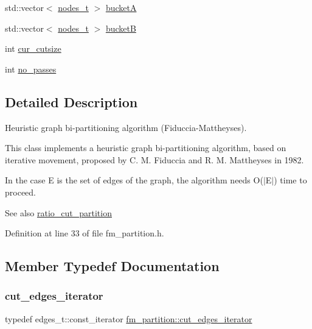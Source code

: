 \begin{DoxyCompactItemize}
std\+::vector$<$ \mbox{\hyperlink{edge_8h_a22ac17689106ba21a84e7bc54d1199d6}{nodes\+\_\+t}} $>$ \mbox{\hyperlink{classfm__partition_a399955e0c84bad93cb82b5ffe8cf4a04}{bucketA}}
\item 
std\+::vector$<$ \mbox{\hyperlink{edge_8h_a22ac17689106ba21a84e7bc54d1199d6}{nodes\+\_\+t}} $>$ \mbox{\hyperlink{classfm__partition_ae6a5b5f3f2d95ea229882e861ccfc9e4}{bucketB}}
\item 
int \mbox{\hyperlink{classfm__partition_abc8f24c354d2a15f8ec8ef9a46252c93}{cur\+\_\+cutsize}}
\item 
int \mbox{\hyperlink{classfm__partition_af35277f499ad76a979ee33b0cd388dc5}{no\+\_\+passes}}
\end{DoxyCompactItemize}


\subsection{Detailed Description}
Heuristic graph bi-\/partitioning algorithm (Fiduccia-\/\+Mattheyses). 

This class implements a heuristic graph bi-\/partitioning algorithm, based on iterative movement, proposed by C. M. Fiduccia and R. M. Mattheyses in 1982.

In the case E is the set of edges of the graph, the algorithm needs {\ttfamily O($\vert$\+E$\vert$)} time to proceed.

\begin{DoxySeeAlso}{See also}
\mbox{\hyperlink{classratio__cut__partition}{ratio\+\_\+cut\+\_\+partition}} 
\end{DoxySeeAlso}


Definition at line 33 of file fm\+\_\+partition.\+h.



\subsection{Member Typedef Documentation}
\mbox{\label{classfm__partition_a15e854cf1efcae91d05a48f2a9fd0761}} 
\subsubsection{\texorpdfstring{cut\+\_\+edges\+\_\+iterator}{cut\_edges\_iterator}}
{\footnotesize\ttfamily typedef edges\+\_\+t\+::const\+\_\+iterator \mbox{\hyperlink{classfm__partition_a15e854cf1efcae91d05a48f2a9fd0761}{fm\+\_\+partition\+::cut\+\_\+edges\+\_\+iterator}}}

